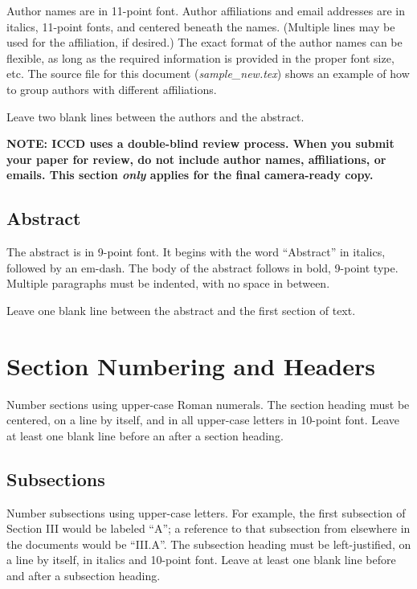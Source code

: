\documentclass[letterpaper, 10 pt, conference]{ieeeconf}  %
\begin{document}
Author names are in 11-point font.  Author affiliations
and email addresses are in italics, 11-point fonts, and centered beneath the names.
(Multiple lines may be used for the affiliation, if desired.)  The exact format
of the author names can be flexible, as long as the required information is provided
in the proper font size, etc.   The source file for this document ({\em sample\_new.tex}) 
shows an example of how to group authors with different affiliations.

Leave two blank lines between the authors and the abstract.

\textbf{NOTE: ICCD uses a double-blind review process.  When you submit your paper
for review, do not include author names, affiliations, or emails.  This section
{\em only} applies for the final camera-ready copy.}

\subsection{Abstract} 

The abstract is in 9-point font.  It begins with the word 
``Abstract'' in italics, followed by an em-dash.  The body of the abstract follows
in bold, 9-point type.  Multiple paragraphs must be indented, with no space
in between.

Leave one blank line between the abstract and the first section of text.



\section{Section Numbering and Headers}

Number sections using upper-case Roman numerals.  The section heading must
be centered, on a line by itself, and in all upper-case letters in 10-point font.  
Leave at least one blank line before an after a section heading.

\subsection{Subsections}
Number subsections using upper-case letters.  For example, the first subsection of 
Section III would be labeled ``A''; a reference to that subsection from elsewhere
in the documents would be ``III.A''.  The subsection heading must be left-justified,
on a line by itself, in italics and 10-point font.  Leave at least one blank line before and after
a subsection heading.
\end{document}
